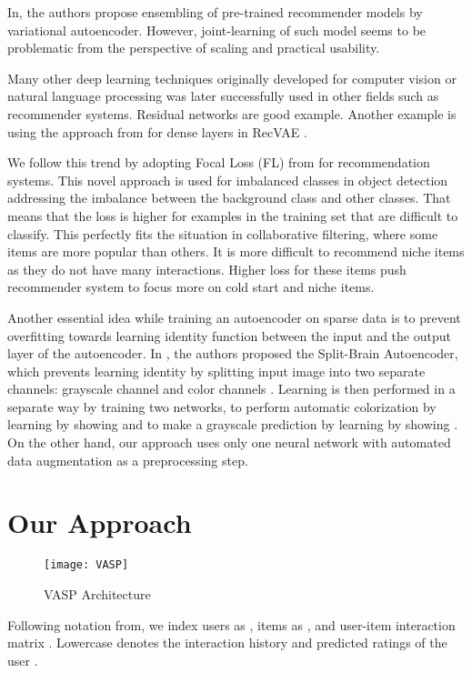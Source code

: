 \documentclass[conference]{IEEEtran}
\begin{document}
        In\cite{drif2020ensvae}, the authors propose ensembling of pre-trained recommender models by variational autoencoder. However, joint-learning of such model seems to be problematic from the perspective of scaling and practical usability.
        
        Many other deep learning techniques originally developed for computer vision or natural language processing was later successfully used in other fields such as recommender systems. Residual networks \cite{He2016} are good example. Another example is using the approach from \cite{Huang2017} for dense layers in RecVAE \cite{Shenbin2020}.

        We follow this trend by adopting Focal Loss (FL) from \cite{Lin2020} for recommendation systems. This novel approach is used for imbalanced classes in object detection addressing the imbalance between the background class and other classes. That means that the loss is higher for examples in the training set that are difficult to classify. This perfectly fits the situation in collaborative filtering, where some items are more popular than others. It is more difficult to recommend niche items as they do not have many interactions. Higher loss for these items push recommender system to focus more on cold start and niche items. 

        Another essential idea while training an autoencoder on sparse data is to prevent overfitting towards learning identity function between the input and the output layer of the autoencoder\cite{Steck2020}. In \cite{zhang2017split}, the authors proposed the Split-Brain Autoencoder, which prevents learning identity by splitting input image into two separate channels: grayscale channel  and color channels . Learning is then performed in a separate way by training two networks,  to perform automatic colorization by learning  by showing  and  to make a grayscale prediction by learning  by showing .
        On the other hand, our approach uses only one neural network with automated data augmentation as a preprocessing step. 

        
\section{Our Approach}
        \begin{figure}
            \centering 
            \texttt{[image: VASP]} 
            \caption{VASP Architecture}
            \label{fig:vasp}
        \end{figure}  
    Following notation from\cite{Liang2018}, we index users as , items as , and user-item interaction matrix . Lowercase  denotes the interaction history and  predicted ratings of the user .
    
\end{document}
